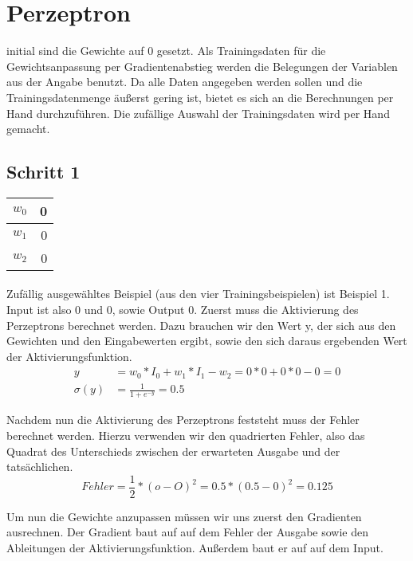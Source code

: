 \documentclass[a4paper]{article}
\begin{document}
\section{Perzeptron}
initial sind die Gewichte auf 0 gesetzt. Als Trainingsdaten für die Gewichtsanpassung per Gradientenabstieg werden die Belegungen der Variablen aus der Angabe benutzt. Da alle Daten angegeben werden sollen und die Trainingsdatenmenge äußerst gering ist, bietet es sich an die Berechnungen per Hand durchzuführen. Die zufällige Auswahl der Trainingsdaten wird per Hand gemacht.

\subsection{Schritt 1}
\begin{tabular}{|l|r|}
	\hline
	$w_0$ & 0 \\\hline
	$w_1$ & 0 \\\hline
	$w_2$ & 0 \\\hline
\end{tabular}
\paragraph{}
Zufällig ausgewähltes Beispiel (aus den vier Trainingsbeispielen) ist Beispiel 1. Input ist also 0 und 0, sowie Output 0.
Zuerst muss die Aktivierung des Perzeptrons berechnet werden. Dazu brauchen wir den Wert y, der sich aus den Gewichten und den Eingabewerten ergibt, sowie den sich daraus ergebenden Wert der Aktivierungsfunktion.
\begin{align*}
	y &= w_0 * I_0 + w_1 * I_1 - w_2 = 0 * 0 + 0 * 0 - 0 = 0 \\
	\sigma(y) &= \frac{1}{1 + e^{-y}} = 0.5
\end{align*}

Nachdem nun die Aktivierung des Perzeptrons feststeht muss der Fehler berechnet werden. Hierzu verwenden wir den quadrierten Fehler, also das Quadrat des Unterschieds zwischen der erwarteten Ausgabe und der tatsächlichen.
\[
	Fehler = \frac{1}{2} * (o - O)^2 = 0.5 * (0.5 - 0)^2 = 0.125
\]

Um nun die Gewichte anzupassen müssen wir uns zuerst den Gradienten ausrechnen.
Der Gradient baut auf auf dem Fehler der Ausgabe sowie den Ableitungen der Aktivierungsfunktion. Außerdem baut er auf auf dem Input.
\end{document}

